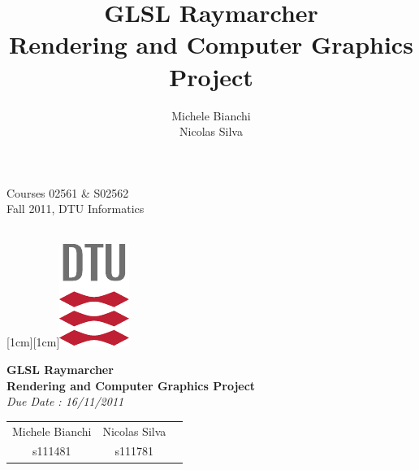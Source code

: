 \documentclass[9pt,a4paper]{scrreprt}
\title{GLSL Raymarcher \\ Rendering and Computer Graphics Project}
\author{ Michele Bianchi \\ Nicolas Silva }
\begin{document}

\noindent\parbox[t]{9cm}{\textsf{Courses 02561 \& S02562 \\
Fall 2011, DTU Informatics }}
\hfill
\parbox[t]{1cm}{\mbox{}\\
\raisebox{0.0cm}[1cm][1cm]{\includegraphics[origin=lb]{dtu_logo_cmyk.pdf}}}

\vspace{3cm}

\begin{center}
{\Huge \bf GLSL Raymarcher \\ Rendering and Computer Graphics Project}\\
\vspace{0.3cm}
{\it Due Date : 16/11/2011}\\ %
\vspace{1cm}
\vspace{0.3cm}
\begin{tabular}{ccc}
{\large Michele Bianchi}&{\large Nicolas Silva}\\
s111481&s111781&
\end{tabular}\\
\end{center}


\newpage


\newpage

\newpage

\newpage

\newpage

\end{document}
